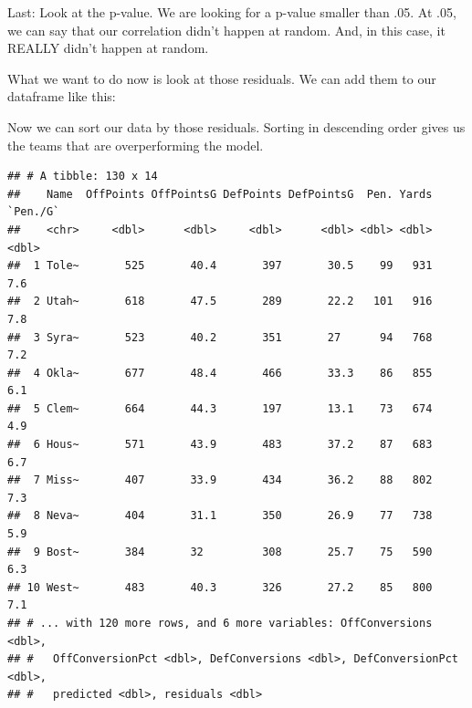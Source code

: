 \documentclass[]{book}
\newenvironment{Shaded}{\begin{snugshade}}{\end{snugshade}}
\newcommand{\KeywordTok}[1]{\textcolor[rgb]{0.13,0.29,0.53}{\textbf{#1}}}
\newcommand{\StringTok}[1]{\textcolor[rgb]{0.31,0.60,0.02}{#1}}
\newcommand{\OperatorTok}[1]{\textcolor[rgb]{0.81,0.36,0.00}{\textbf{#1}}}
\newcommand{\NormalTok}[1]{#1}
\begin{document}
Last: Look at the p-value. We are looking for a p-value smaller than
.05. At .05, we can say that our correlation didn't happen at random.
And, in this case, it REALLY didn't happen at random.

What we want to do now is look at those residuals. We can add them to
our dataframe like this:

\begin{Shaded}
\end{Shaded}

Now we can sort our data by those residuals. Sorting in descending order
gives us the teams that are overperforming the model.

\begin{Shaded}
\end{Shaded}

\begin{verbatim}
## # A tibble: 130 x 14
##    Name  OffPoints OffPointsG DefPoints DefPointsG  Pen. Yards `Pen./G`
##    <chr>     <dbl>      <dbl>     <dbl>      <dbl> <dbl> <dbl>    <dbl>
##  1 Tole~       525       40.4       397       30.5    99   931      7.6
##  2 Utah~       618       47.5       289       22.2   101   916      7.8
##  3 Syra~       523       40.2       351       27      94   768      7.2
##  4 Okla~       677       48.4       466       33.3    86   855      6.1
##  5 Clem~       664       44.3       197       13.1    73   674      4.9
##  6 Hous~       571       43.9       483       37.2    87   683      6.7
##  7 Miss~       407       33.9       434       36.2    88   802      7.3
##  8 Neva~       404       31.1       350       26.9    77   738      5.9
##  9 Bost~       384       32         308       25.7    75   590      6.3
## 10 West~       483       40.3       326       27.2    85   800      7.1
## # ... with 120 more rows, and 6 more variables: OffConversions <dbl>,
## #   OffConversionPct <dbl>, DefConversions <dbl>, DefConversionPct <dbl>,
## #   predicted <dbl>, residuals <dbl>
\end{verbatim}
\end{document}
